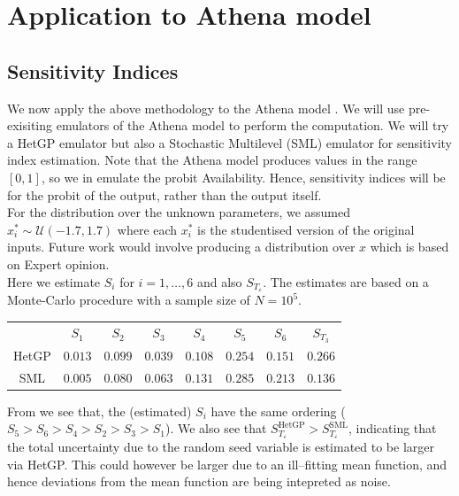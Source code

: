 \documentclass[12pt]{article}
\begin{document}
\section{Application to Athena model}
\subsection{Sensitivity Indices}
We now apply the above methodology to the Athena model \citep{Zit13, Zit16}. We will use pre-exisiting emulators of the Athena model to perform the computation. We will try a HetGP emulator but also a Stochastic Multilevel (SML) emulator for sensitivity index estimation. Note that the Athena model produces values in the range $[0,1]$, so we in emulate the probit Availability. Hence, sensitivity indices will be for the probit of the output, rather than the output itself.\\

For the distribution over the unknown parameters, we assumed $x_i^* \sim \mathcal{U}(-1.7, 1.7)$ where each $x_i^*$ is the studentised version of the original inputs. Future work would involve producing a distribution over $x$ which is based on Expert opinion.\\

Here we estimate $S_i$ for $i = 1,\ldots,6$ and also $S_{T_\varepsilon}$. The estimates are based on a Monte-Carlo procedure with a sample size of $N = 10^5$.

\begin{table}[h]
	\centering
	\begin{tabular}{cccccccc}
	\toprule
	& $S_1$ & $S_2$ & $S_3$ & $S_4$ &$S_5$ &$S_6$ &$S_{T_3}$ \\ \cmidrule{1-8}
	HetGP& $0.013$ & $0.099$ & $0.039$ & $0.108$ & $0.254$ & $0.151$ & $0.266$ \\
	SML& $0.005$ & $0.080$ & $0.063$ & $0.131$ & $0.285$ & $0.213$  & $0.136$\\ \bottomrule
	\end{tabular}
	\label{Tab:athena-si}
\end{table}

From  we see that, the (estimated) $S_i$ have the same ordering ($S_5 > S_6 > S_4 > S_2 > S_3 > S_1$). We also see that $S_{T_\varepsilon}^{\text{HetGP}} > S_{T_\varepsilon}^{\text{SML}}$, indicating that the total uncertainty due to the random seed variable is estimated to be larger via HetGP. This could however be larger due to an ill--fitting mean function, and hence deviations from the mean function are being intepreted as noise. \\
\end{document}
